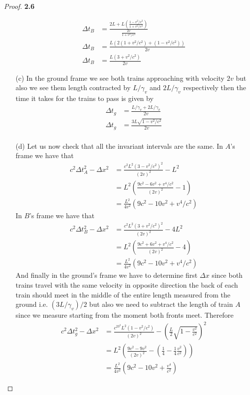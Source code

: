 \documentclass[11pt]{article}
\theoremstyle{definition}
\begin{document}
\begin{proof}{\textbf{2.6}}
\begin{itemize}
\begin{align*}
                \Delta t_B &= \frac{2L + L(\frac{1 - v^2/c^2}{1 + v^2/c^2})}
                {\frac{2v}{1 + v^2/c^2}}\\
                \Delta t_B &= \frac{L(2(1 + v^2/c^2) + (1 - v^2/c^2))}{2v}\\
                \Delta t_B &= \frac{L(3 + v^2/c^2)}{2v}
            \end{align*}
            \item [(c)] In the ground frame we see both trains approaching with velocity
            $2v$ but also we see them length contracted by $L/\gamma_v$ and $2L/\gamma_v$
            respectively then the time it takes for the trains to pass is given by
            \begin{align*}
                \Delta t_g &= \frac{L/\gamma_v + 2L/\gamma_v}{2v}\\
                \Delta t_g &= \frac{3L\sqrt{1 - v^2/c^2}}{2v}\\
            \end{align*}
            \item [(d)] Let us now check that all the invariant intervals are the same.
            In $A$'s frame we have that
            \begin{align*}
                c^2\Delta t_A^2 - \Delta x^2 &= \frac{c^2L^2(3 - v^2/c^2)^2}{(2v)^2} - L^2\\
                    &= L^2(\frac{9c^2 - 6v^2 + v^4/c^2}{(2v)^2} - 1)\\
                    &= \frac{L^2}{4v^2}(9c^2 - 10v^2 + v^4/c^2)
            \end{align*}
            In $B$'s frame we have that
            \begin{align*}
                c^2\Delta t_B^2 - \Delta x^2 &= \frac{c^2L^2(3 + v^2/c^2)^2}{(2v)^2} - 4L^2\\
                    &= L^2(\frac{9c^2 + 6v^2 + v^4/c^2}{(2v)^2} - 4)\\
                    &= \frac{L^2}{4v^2}(9c^2 - 10v^2 + v^4/c^2)
            \end{align*}
            And finally in the ground's frame we have to determine first $\Delta x$
            since both trains travel with the same velocity in opposite direction the
            back of each train should meet in the middle of the entire length measured
            from the ground i.e. $(3L/\gamma_v)/2$ but also we need to subtract the
            length of train $A$ since we measure starting from the moment both fronts
            meet. Therefore 
            \begin{align*}
                c^2\Delta t_g^2 - \Delta x^2 &= \frac{c^23^2L^2(1 - v^2/c^2)}{(2v)^2} -
                    \left(\frac{L}{2}\sqrt{1-\frac{v^2}{c^2}}\right)^2\\
                    &= L^2\left(\frac{9c^2-9v^2}{(2v)^2} - 
                    (\frac{1}{4}-\frac{1}{4}\frac{v^2}{c^2})\right)\\
                    &= \frac{L^2}{4v^2}(9c^2 -10v^2 + \frac{v^4}{c^2})
            \end{align*}
            
        \end{itemize}       
    \end{proof}
\end{document}
